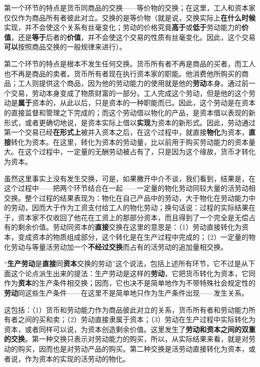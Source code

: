 第一个环节的特点是货币同商品的交换——等价物的交换；在这里，工人和资本家仅仅作为商品所有者彼此对立。交换的是等价物（就是说，交换实际上\textbf{在什么时候}实现，并不会使这个关系有丝毫变化；劳动的价格究竟\textbf{高于}或\textbf{低于}劳动能力的\textbf{价值}，还是\textbf{等于}后者的\textbf{价值}，并不会使这个交易的性质有丝毫变化。因此，这个交易\textbf{可以}按照商品交换的一般规律来进行）。

第二个环节的特点是根本不发生任何交换。货币所有者不再是商品的买者，而工人也不再是商品的卖者。货币所有者现在执行资本家的职能。他消费他所购买的商品；工人则提供这个商品，因为他的劳动能力的使用就是他的\textbf{劳动}本身。通过前一个交易，劳动本身变成了物质财富的一部分。工人完成这个劳动，但是他的这个劳动是\textbf{属于}资本的，从此以后，只是资本的一种职能而已。因此，这个劳动是在资本的直接监督和管理之下完成的；而这个劳动借以物化的产品，是资本借以表现的新形式，或者更确切地说，是资本实际上借以\textbf{实现}为资本的新形式。因此，劳动通过第一个交易已经\textbf{在形式上}被并入资本之后，在这个过程中，就直接\textbf{物化}为资本，\textbf{直接}转化为资本。在这里，转化为资本的劳动量，比以前用于购买劳动能力的资本量大。在这个过程中，一定量的无酬劳动被占有了，只是因为这个缘故，货币才转化为资本。

虽然这里事实上没有发生交换，可是，如果撇开中介不谈，我们看到，结果是，在这个过程中——把两个环节结合在一起——一定量的物化劳动同较大量的活劳动相交换。整个过程的结果表现为：物化在自己产品中的劳动，大于物化在劳动能力中的劳动，因而大于作为工资支付给工人的物化劳动；换句话说：过程的实际结果在于，资本家不仅收回了他花在工资上的那部分资本，而且得到了一个完全是无偿占有的剩余价值。劳动同资本的\textbf{直接}交换在这里的意思是：（1）劳动直接转化为资本，变成资本的物质组成部分，这个转化是在生产过程中完成的；（2）一定量的物化劳动与等量活劳动加一个\textbf{不经过交换}而占有的活劳动的追加量相交换。

“\textbf{生产劳动}是\textbf{直接}同\textbf{资本}交换的劳动”这个说法，包括上述所有环节，它不过是从下面这个论点派生出来的提法：生产劳动是这样的\textbf{劳动}，它把货币转化为资本，它同作为\textbf{资本}的生产条件相交换；因而，它也决不是简单地作为不带特殊社会规定性的\textbf{劳动}同这些生产条件——在这里不是简单地只作为生产条件出现——发生关系。

这包括：（1）货币和劳动能力作为商品彼此对立的关系，货币所有者和劳动能力所有者之间的买和卖；（2）劳动直接隶属于资本；（3）劳动在生产过程中实际转化为资本，或者同样可以说，为资本创造剩余价值。这里发生了\textbf{劳动和资本之间的双重的交换}。第一种交换只表示对劳动能力的购买，所以，从实际结果来看，就是对劳动的购买，因而也是对劳动产品的购买。第二种交换是活劳动直接转化为资本，或者说，作为资本的实现的活劳动的物化。

